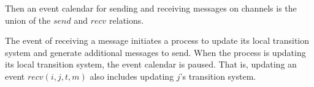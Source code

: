 \documentclass{llncs/llncs}
\newcommand{\lee}[1]{ } %
\newcommand{\lee}[1]{ {\color{blue}$<$lee: #1$>$} } %
\begin{document}
Then an event calendar for sending and receiving messages on channels is the union of the $send$ and $recv$ relations.

The event of receiving a message initiates a process to update its local transition system and generate additional messages to send. When the process is updating its local transition system, the event calendar is paused. That is, updating an event $recv(i, j, t, m)$ also includes updating $j$'s transition system.







\end{document}
